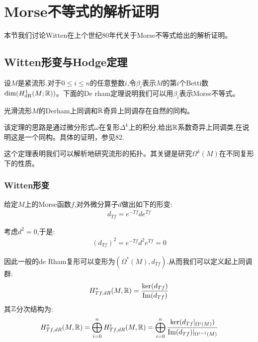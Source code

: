 \ifx\allfiles\undefined

	
	
\else
\fi
\chapter{Morse不等式的解析证明}
本节我们讨论Witten在上个世纪80年代关于Morse不等式给出的解析证明。%
\section{Witten形变与Hodge定理}
设$M$是紧流形.对于$0\leq  i\leq n$的任意整数$i$,令$\beta_i$表示$M$的第$i$个Betti数$\dim (H_{\mathrm{dR}}^1(M;\mathbb{R}))$。下面的De rham定理说明我们可以用$\beta_i$表示Morse不等式。
\begin{theorem}[De rham定理]
	光滑流形$M$的Derham上同调和$\mathbb{R}$奇异上同调存在自然的同构。
\end{theorem}
该定理的思路是通过微分形式$\omega$在复形$\Delta^k$上的积分,给出$\mathbb{R}$系数奇异上同调类,在说明这是一个同构。具体的证明，参见82.

这个定理表明我们可以解析地研究流形的拓扑。其关键是研究$\Omega^k(M)$在不同复形下的性质。

\subsection{Witten形变}
给定$M$上的Morse函数$f$,对外微分算子$d$做出如下的形变:
\begin{align}
	d_{Tf}=e^{-Tf}d e^{Tf}
\end{align}

考虑$d^2=0$,于是:
\begin{align*}
	(d_{Tf})^2=e^{-Tf}d^2 e^{Tf}=0
\end{align*}

因此一般的de Rham复形可以变形为$(\Omega^*(M),d_{Tf})$.从而我们可以定义起上同调群:
\begin{align*}
	H_{Tf,dR}^*(M,\mathbb{R})=\frac{\ker(d_{Tf})}{\mathrm{Im}(d_{Tf})}
\end{align*}
其$\mathbb{Z}$分次结构为:
\begin{align*}
	H_{Tf,dR}^*(M,\mathbb{R})=\bigoplus_{i=0}^n H_{Tf,dR}^i(M,\mathbb{R})=\bigoplus_{i=0}^n \frac{\ker(d_{Tf}|_{\Omega^i(M)})}{\mathrm{Im}(d_{Tf})|_{\Omega^{i-1}(M)}}
\end{align*}

